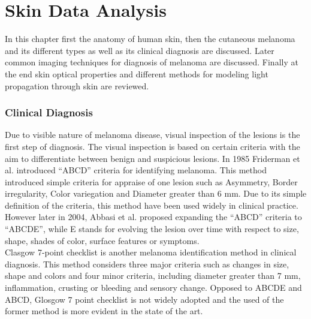 \chapter{Skin Data Analysis}
In this chapter first the anatomy of human skin, then the cutaneous melanoma and its different types as well as its clinical diagnosis are discussed. Later common imaging techniques for diagnosis of melanoma are discussed. Finally at the end skin optical properties and different methods for modeling light propagation through skin are reviewed. 



	


	
	
	\subsection{Clinical Diagnosis}
Due to visible nature of melanoma disease, visual inspection of the lesions is the first step of diagnosis. The visual inspection is based on certain criteria with the aim to differentiate between benign and suspicious lesions. In 1985 Friderman et al. \cite{Friedman1985} introduced ``ABCD'' criteria for identifying melanoma. This method introduced simple criteria for appraise of one lesion such as Asymmetry, Border irregularity, Color variegation and Diameter greater than 6 mm.  Due to its simple definition of the criteria, this method have been used widely in clinical practice. However later in 2004, Abbasi et al. \cite{Abbasi2004} proposed expanding the ``ABCD'' criteria to ``ABCDE'', while E stands for evolving the lesion over time with respect to size, shape, shades of color, surface features or symptoms. \\

 Clasgow 7-point checklist \cite{Mackie1991} is another melanoma identification method in clinical diagnosis. This method considers three major criteria such as changes in size, shape and colors and four minor criteria, including diameter greater than 7 mm, inflammation, crusting or bleeding and sensory change. Opposed to ABCDE and ABCD, Glosgow 7 point checklist is not widely adopted and the used of the former method is more evident in the state of the art. 
 


